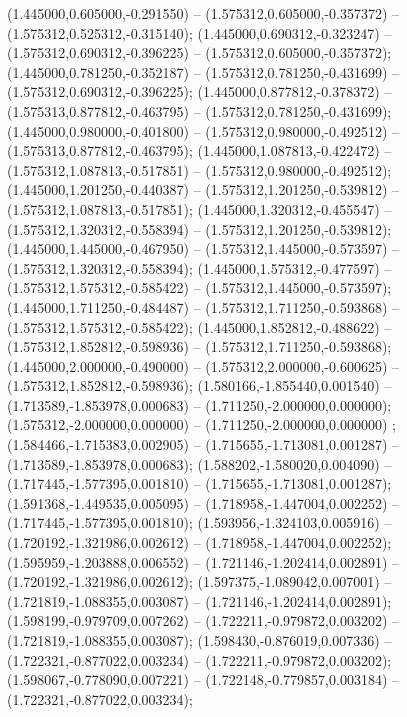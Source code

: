  (1.445000,0.605000,-0.291550) -- (1.575312,0.605000,-0.357372) -- (1.575312,0.525312,-0.315140);
 (1.445000,0.690312,-0.323247) -- (1.575312,0.690312,-0.396225) -- (1.575312,0.605000,-0.357372);
 (1.445000,0.781250,-0.352187) -- (1.575312,0.781250,-0.431699) -- (1.575312,0.690312,-0.396225);
 (1.445000,0.877812,-0.378372) -- (1.575313,0.877812,-0.463795) -- (1.575312,0.781250,-0.431699);
 (1.445000,0.980000,-0.401800) -- (1.575312,0.980000,-0.492512) -- (1.575313,0.877812,-0.463795);
 (1.445000,1.087813,-0.422472) -- (1.575312,1.087813,-0.517851) -- (1.575312,0.980000,-0.492512);
 (1.445000,1.201250,-0.440387) -- (1.575312,1.201250,-0.539812) -- (1.575312,1.087813,-0.517851);
 (1.445000,1.320312,-0.455547) -- (1.575312,1.320312,-0.558394) -- (1.575312,1.201250,-0.539812);
 (1.445000,1.445000,-0.467950) -- (1.575312,1.445000,-0.573597) -- (1.575312,1.320312,-0.558394);
 (1.445000,1.575312,-0.477597) -- (1.575312,1.575312,-0.585422) -- (1.575312,1.445000,-0.573597);
 (1.445000,1.711250,-0.484487) -- (1.575312,1.711250,-0.593868) -- (1.575312,1.575312,-0.585422);
 (1.445000,1.852812,-0.488622) -- (1.575312,1.852812,-0.598936) -- (1.575312,1.711250,-0.593868);
 (1.445000,2.000000,-0.490000) -- (1.575312,2.000000,-0.600625) -- (1.575312,1.852812,-0.598936);
 (1.580166,-1.855440,0.001540) -- (1.713589,-1.853978,0.000683) -- (1.711250,-2.000000,0.000000);
 (1.575312,-2.000000,0.000000) -- (1.711250,-2.000000,0.000000) ;
 (1.584466,-1.715383,0.002905) -- (1.715655,-1.713081,0.001287) -- (1.713589,-1.853978,0.000683);
 (1.588202,-1.580020,0.004090) -- (1.717445,-1.577395,0.001810) -- (1.715655,-1.713081,0.001287);
 (1.591368,-1.449535,0.005095) -- (1.718958,-1.447004,0.002252) -- (1.717445,-1.577395,0.001810);
 (1.593956,-1.324103,0.005916) -- (1.720192,-1.321986,0.002612) -- (1.718958,-1.447004,0.002252);
 (1.595959,-1.203888,0.006552) -- (1.721146,-1.202414,0.002891) -- (1.720192,-1.321986,0.002612);
 (1.597375,-1.089042,0.007001) -- (1.721819,-1.088355,0.003087) -- (1.721146,-1.202414,0.002891);
 (1.598199,-0.979709,0.007262) -- (1.722211,-0.979872,0.003202) -- (1.721819,-1.088355,0.003087);
 (1.598430,-0.876019,0.007336) -- (1.722321,-0.877022,0.003234) -- (1.722211,-0.979872,0.003202);
 (1.598067,-0.778090,0.007221) -- (1.722148,-0.779857,0.003184) -- (1.722321,-0.877022,0.003234);
